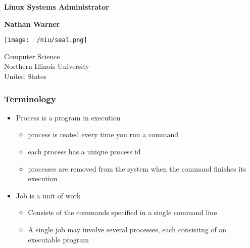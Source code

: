 \documentclass{report}
\title{\Huge{}}
\author{\huge{Nathan Warner}}
\date{\huge{}}
\begin{document}
        \begin{titlepage}
       \begin{center}
           \vspace*{1cm}
    
           \textbf{Linux Systems Administrator}
    
           \vspace{0.5cm}
            
                
           \vspace{1.5cm}
    
           \textbf{Nathan Warner}
    
           \vfill
                
                
           \vspace{0.8cm}
         
           \texttt{[image: ~/niu/seal.png]}
                
           Computer Science \\
           Northern Illinois University\\
           United States\\
           
                
       \end{center}
    \end{titlepage}
    \tableofcontents
    
    \pagebreak 
    \bigbreak \noindent 
    \subsubsection{Terminology}
    \begin{itemize}
        \item Process is a program in execution
            \begin{itemize}
                \item process is reated every time you run a command
                \item each process has a unique process id
                \item processes are removed from the system when the command finishes its execution
            \end{itemize}
        \item Job is a unit of work
            \begin{itemize}
                \item Consists of the commands specified in a single command line
                \item A single job may involve several processes, each consisitng of an executable program
            \end{itemize}
    \end{itemize}
    \bigbreak \noindent 
\end{document}
